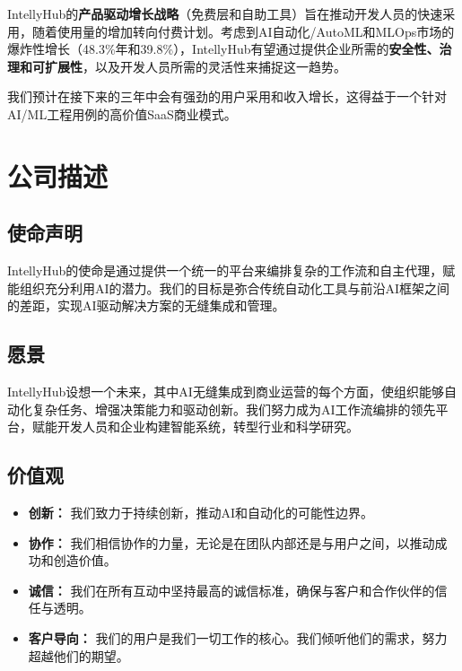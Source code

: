 \documentclass[11pt, a4paper, oneside]{article}
\begin{document}
IntellyHub的\textbf{产品驱动增长战略}（免费层和自助工具）旨在推动开发人员的快速采用，随着使用量的增加转向付费计划。考虑到AI自动化/AutoML和MLOps市场的爆炸性增长（48.3\%年\cite{AIMarket}和39.8\%\cite{MLOpsMarket}），IntellyHub有望通过提供企业所需的\textbf{安全性、治理和可扩展性}，以及开发人员所需的灵活性来捕捉这一趋势。

我们预计在接下来的三年中会有强劲的用户采用和收入增长，这得益于一个针对AI/ML工程用例的高价值SaaS商业模式。

\section{公司描述}
\subsection{使命声明}
IntellyHub的使命是通过提供一个统一的平台来编排复杂的工作流和自主代理，赋能组织充分利用AI的潜力。我们的目标是弥合传统自动化工具与前沿AI框架之间的差距，实现AI驱动解决方案的无缝集成和管理。

\subsection{愿景}
IntellyHub设想一个未来，其中AI无缝集成到商业运营的每个方面，使组织能够自动化复杂任务、增强决策能力和驱动创新。我们努力成为AI工作流编排的领先平台，赋能开发人员和企业构建智能系统，转型行业和科学研究。

\subsection{价值观}
\begin{itemize}
    \item \textbf{创新：} 我们致力于持续创新，推动AI和自动化的可能性边界。
    \item \textbf{协作：} 我们相信协作的力量，无论是在团队内部还是与用户之间，以推动成功和创造价值。
    \item \textbf{诚信：} 我们在所有互动中坚持最高的诚信标准，确保与客户和合作伙伴的信任与透明。
    \item \textbf{客户导向：} 我们的用户是我们一切工作的核心。我们倾听他们的需求，努力超越他们的期望。
\end{itemize}
\end{document}
